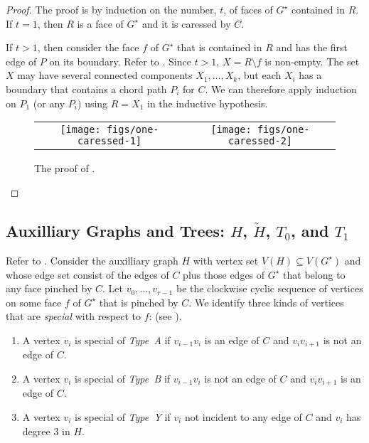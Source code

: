 \documentclass{patmorin}
\newcommand{\dual}[1]{{#1}^\star}
\begin{document}
\begin{proof}
   The proof is by
   induction on the number, $t$, of faces of $\dual{G}$ contained in $R$.
   If $t=1$, then $R$ is a face of $\dual{G}$ and it is caressed by $C$.

   If $t>1$, then consider the face $f$ of $\dual{G}$ that is contained
   in $R$ and has the first edge of $P$ on its boundary.  Refer to
   . Since $t>1$, $X=R\setminus f$ is non-empty. The
   set $X$ may have several connected components $X_1,\ldots,X_k$, but
   each $X_i$ has a boundary that contains a chord path $P_i$ for $C$.
   We can therefore apply induction on $P_1$ (or any $P_i$) using $R=X_1$
   in the inductive hypothesis.
  \begin{figure}
     \begin{center}
	\begin{tabular}{cc}
		\texttt{[image: figs/one-caressed-1]} &
		\texttt{[image: figs/one-caressed-2]}
	\end{tabular}
     \end{center}
	  \caption{The proof of .}
  \end{figure}
\end{proof}

\subsection{Auxilliary Graphs and Trees: $H$, $\tilde{H}$, $T_0$, and $T_1$}

Refer to . Consider the auxilliary
graph $H$ with vertex set $V(H)\subseteq V(\dual{G})$ and whose edge set
consist of the edges of $C$ plus those edges of $\dual{G}$ that belong
to any face pinched by $C$. Let $v_0,\ldots,v_{r-1}$ be the clockwise cyclic sequence of vertices on some face $f$ of $\dual{G}$ that is pinched by $C$.
We identify three kinds of vertices that are \emph{special} with respect to $f$:
(see ).
\begin{enumerate}
  \item A vertex $v_i$ is special of \emph{Type~A} if $v_{i-1}v_i$ is an edge of $C$ and $v_iv_{i+1}$ is not an edge of $C$.
  \item A vertex $v_i$ is special of \emph{Type~B} if $v_{i-1}v_i$ is not an edge of $C$ and $v_iv_{i+1}$ is an edge of $C$.
  \item A vertex $v_i$ is special of \emph{Type~Y} if $v_i$ not incident to any edge of $C$ and $v_i$ has degree 3 in $H$.
\end{enumerate}
\end{document}
